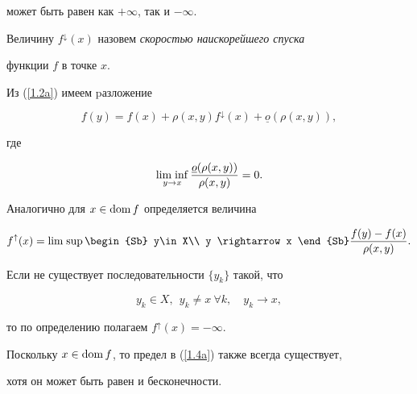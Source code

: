 может быть равен как $+\infty$, так и $-\infty $.





Величину $f^{\downarrow}(x)$ назовем {\it скоростью наискорейшего спуска}


функции $f$ в точке $x$.





Из (\ref{1.2a}) имеем pазложение


$$


f(y) = f(x) + \rho(x,y)f^{\downarrow}(x) + \underline o(\rho(x,y)),


$$


где


$$




\Liminf\limits_{y \rightarrow x}


\frac{\underline o(\rho(x,y))}{\rho(x,y)} = 0.




$$





Аналогично для $x\in \operatorname{dom} f$ определяется величина


\begin{equation}\label{1.4a}


f^{\uparrow}(x) = \Limsup\limits \begin{Sb} y\in X\\


y \rightarrow x \end{Sb} \frac{f(y) - f(x)}{\rho(x,y)}.


\end{equation}





Если не существует последовательности $\{y_k\}$ такой, что


$$


y_k\in X, \ \ y_k \neq x \ \forall k, \quad y_k\rightarrow x,


$$


то по определению полагаем $f^{\uparrow}(x) = -\infty.$


Поскольку $x\in \operatorname{dom} f$, то предел в (\ref{1.4a}) также всегда существует,


хотя он может быть равен и бесконечности.





